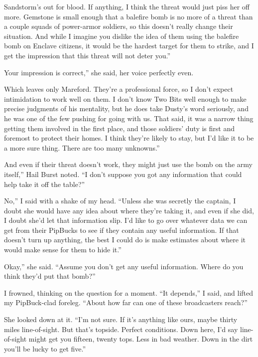 \leavevmode{}Sandstorm’s out for blood. If anything, I think the threat would just piss her off more. Gemstone is small enough that a balefire bomb is no more of a threat than a couple squads of power-armor soldiers, so this doesn’t really change their situation. And while I imagine you dislike the idea of them using the balefire bomb on Enclave citizens, it would be the hardest target for them to strike, and I get the impression that this threat will not deter you.”

\leavevmode{}Your impression is correct,” she said, her voice perfectly even.

\leavevmode{}Which leaves only Mareford. They’re a professional force, so I don’t expect intimidation to work well on them. I don’t know Two Bits well enough to make precise judgments of his mentality, but he does take Dusty’s word seriously, and he was one of the few pushing for going with us. That said, it was a narrow thing getting them involved in the first place, and those soldiers’ duty is first and foremost to protect their homes. I think they’re likely to stay, but I’d like it to be a more sure thing. There are too many unknowns.”

\leavevmode{}And even if their threat doesn’t work, they might just use the bomb on the army itself,” Hail Burst noted. “I don’t suppose you got any information that could help take it off the table?”

\leavevmode{}No,” I said with a shake of my head. “Unless she was secretly the captain, I doubt she would have any idea about where they’re taking it, and even if she did, I doubt she’d let that information slip. I’d like to go over whatever data we can get from their PipBucks to see if they contain any useful information. If that doesn’t turn up anything, the best I could do is make estimates about where it would make sense for them to hide it.”

\leavevmode{}Okay,” she said. “Assume you don’t get any useful information. Where do you think they’d put that bomb?”

I frowned, thinking on the question for a moment. “It depends,” I said, and lifted my PipBuck-clad foreleg. “About how far can one of these broadcasters reach?”

She looked down at it. “I’m not sure. If it’s anything like ours, maybe thirty miles line-of-sight. But that’s topside. Perfect conditions. Down here, I’d say line-of-sight might get you fifteen, twenty tops. Less in bad weather. Down in the dirt you’ll be lucky to get five.”

